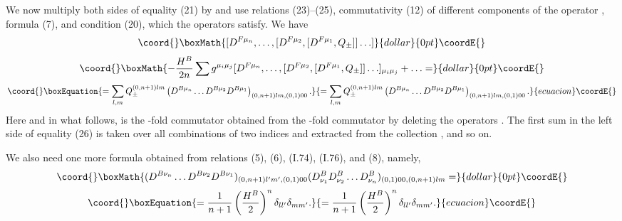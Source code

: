 \documentclass[a4paper,12pt]{article}
\begin{document}
We now multiply both sides of equality (21) by \coordHE{} and use relations (23)--(25),
commutativity (12) of different components of the operator \coordHE{}, formula
(7), and condition (20), which the operators \coordHE{} satisfy. We have
$$\coord{}\boxMath{[D^{F \mu_{n}}, \ldots, [D^{F \mu_{2}},[ D^{F \mu_{1}},Q_{\pm}]] \ldots ]}{dollar}{0pt}\coordE{}$$  $$\coord{}\boxMath{- \frac{H^{B}}{2n} \sum g^{\mu_{i} \mu_{j}}
[D^{F \mu_{n}}, \ldots, [D^{F \mu_{2}},[ D^{F \mu_{1}},Q_{\pm}]] \ldots 
]_{\mu_{i}\mu_{j}}+\ldots =}{dollar}{0pt}\coordE{}$$
\begin{equation}\coord{}\boxEquation{
= \sum_{l,m} Q^{(0,n+1)lm}_{\pm}\left( D^{B\mu_{n}} \ldots D^{B\mu_{2}} 
D^{B\mu_{1}}\right)_{(0,n+1)lm,(0,1)00}.
}{
= \sum_{l,m} Q^{(0,n+1)lm}_{\pm}\left( D^{B\mu_{n}} \ldots D^{B\mu_{2}} 
D^{B\mu_{1}}\right)_{(0,n+1)lm,(0,1)00}.
}{ecuacion}\coordE{}\end{equation}
Here and in what follows, \coordHE{} is the \coordHE{}-fold commutator
obtained from the \coordHE{}-fold commutator \coordHE{} by deleting the operators \coordHE{}. The first sum in the left side of equality (26) is taken
over all combinations of two indices \coordHE{} and \coordHE{} extracted from the
collection \coordHE{}, and so on.

We also need one more formula obtained from relations (5), (6), (I.74), (I.76),
and (8), namely,
$$\coord{}\boxMath{(D^{B\nu_{n}} \ldots D^{B\nu_{2}}D^{B\nu_{1}})_{(0,n+1)l'm',(0,1)00}
(D^{B}_{\nu_{1}}D^{B}_{\nu_{2}}\ldots D^{B}_{\nu_{n}})_{(0,1)00,(0,n+1)lm}=}{dollar}{0pt}\coordE{}$$
\begin{equation}\coord{}\boxEquation{
=\frac{1}{n+1} \left( \frac{H^{B}}{2} \right)^{n} \delta_{l l'} \delta_{m m'}.
}{
=\frac{1}{n+1} \left( \frac{H^{B}}{2} \right)^{n} \delta_{l l'} \delta_{m m'}.
}{ecuacion}\coordE{}\end{equation}
\end{document}
